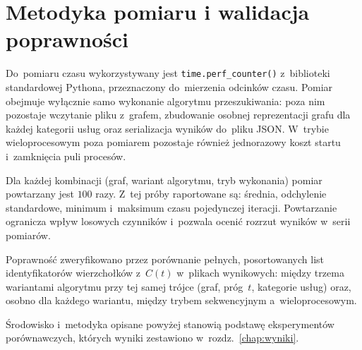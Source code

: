\clearpage

\section{Metodyka pomiaru i walidacja poprawności}
\label{sec:impl:metodyka}

Do~pomiaru czasu wykorzystywany jest
\texttt{time.perf\_counter()} z~biblioteki standardowej Pythona, przeznaczony
do~mierzenia odcinków czasu. Pomiar obejmuje wyłącznie samo wykonanie algorytmu
przeszukiwania: poza nim pozostaje wczytanie pliku z~grafem, zbudowanie osobnej
reprezentacji grafu dla każdej kategorii usług
oraz serializacja wyników do~pliku JSON. W~trybie wieloprocesowym poza pomiarem pozostaje
również jednorazowy koszt startu i~zamknięcia puli procesów.

Dla każdej kombinacji (graf, wariant algorytmu, tryb wykonania) pomiar powtarzany jest
$100$ razy. Z~tej próby raportowane są: średnia, odchylenie standardowe, minimum
i~maksimum czasu pojedynczej iteracji. Powtarzanie ogranicza wpływ losowych czynników
i~pozwala ocenić rozrzut wyników w~serii pomiarów.

Poprawność zweryfikowano przez porównanie pełnych, posortowanych list identyfikatorów
wierzchołków z~$C(t)$ w~plikach wynikowych: między trzema wariantami algorytmu przy tej samej trójce
(graf, próg~$t$, kategorie usług) oraz, osobno dla każdego wariantu, między trybem sekwencyjnym
a~wieloprocesowym.

Środowisko i~metodyka opisane powyżej stanowią podstawę eksperymentów porównawczych,
których wyniki zestawiono w~rozdz.~\ref{chap:wyniki}.
